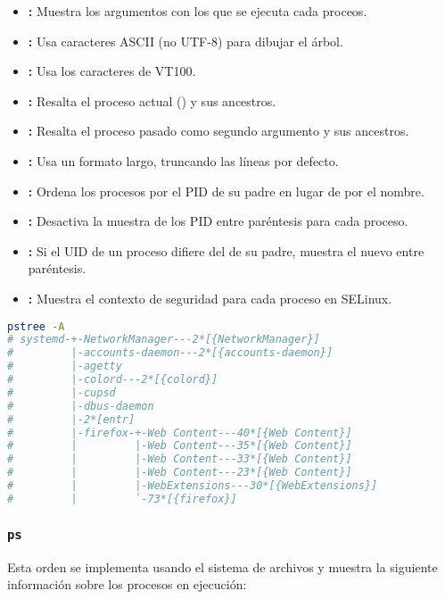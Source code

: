 \begin{itemize}
	\item{}\textbf{:} Muestra los argumentos con los que se ejecuta cada proceos.
	\item{}\textbf{:} Usa caracteres ASCII (no UTF-8) para dibujar el árbol.
	\item{}\textbf{:} Usa los caracteres de VT100.
	\item{}\textbf{:} Resalta el proceso actual () y sus ancestros.
	\item{}\textbf{:} Resalta el proceso pasado como segundo argumento y sus ancestros.
	\item{}\textbf{:} Usa un formato largo, truncando las líneas por defecto.
	\item{}\textbf{:} Ordena los procesos por el PID de su padre en lugar de por el nombre.
	\item{}\textbf{:} Desactiva la muestra de los PID entre paréntesis para cada proceso.
	\item{}\textbf{:} Si el UID de un proceso difiere del de su padre, muestra el nuevo entre paréntesis.
	\item{}\textbf{:} Muestra el contexto de seguridad para cada proceso en SELinux.
\end{itemize}

\begin{lstlisting}[language=Bash]
pstree -A
# systemd-+-NetworkManager---2*[{NetworkManager}]
#         |-accounts-daemon---2*[{accounts-daemon}]
#         |-agetty
#         |-colord---2*[{colord}]
#         |-cupsd
#         |-dbus-daemon
#         |-2*[entr]
#         |-firefox-+-Web Content---40*[{Web Content}]
#         |         |-Web Content---35*[{Web Content}]
#         |         |-Web Content---33*[{Web Content}]
#         |         |-Web Content---23*[{Web Content}]
#         |         |-WebExtensions---30*[{WebExtensions}]
#         |         `-73*[{firefox}]
\end{lstlisting}

\subsubsection{\texttt{ps}}

Esta orden se implementa usando el sistema de archivos  y muestra la siguiente información sobre los procesos en ejecución:

